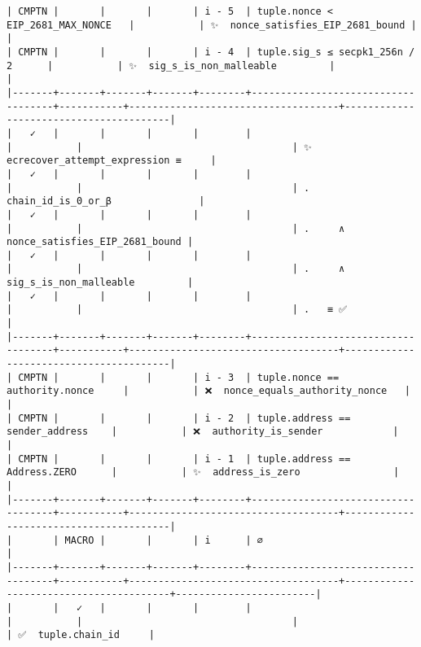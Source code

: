 \documentclass[varwidth=\maxdimen,margin=0.5cm,multi={verbatim}]{standalone}
\begin{document}
\begin{verbatim}
| CMPTN |       |       |       | i - 5  | tuple.nonce < EIP_2681_MAX_NONCE   |           | ✨  nonce_satisfies_EIP_2681_bound |                                        |
| CMPTN |       |       |       | i - 4  | tuple.sig_s ≤ secpk1_256n / 2      |           | ✨  sig_s_is_non_malleable         |                                        |
|-------+-------+-------+-------+--------+------------------------------------+-----------+------------------------------------+----------------------------------------|
|   ✓   |       |       |       |        |                                    |           |                                    | ✨  ecrecover_attempt_expression ≡     |
|   ✓   |       |       |       |        |                                    |           |                                    | .     chain_id_is_0_or_β               |
|   ✓   |       |       |       |        |                                    |           |                                    | .     ∧ nonce_satisfies_EIP_2681_bound |
|   ✓   |       |       |       |        |                                    |           |                                    | .     ∧ sig_s_is_non_malleable         |
|   ✓   |       |       |       |        |                                    |           |                                    | .   ≡ ✅                               |
|-------+-------+-------+-------+--------+------------------------------------+-----------+------------------------------------+----------------------------------------|
| CMPTN |       |       |       | i - 3  | tuple.nonce == authority.nonce     |           | ❌  nonce_equals_authority_nonce   |                                        |
| CMPTN |       |       |       | i - 2  | tuple.address == sender_address    |           | ❌  authority_is_sender            |                                        |
| CMPTN |       |       |       | i - 1  | tuple.address == Address.ZERO      |           | ✨  address_is_zero                |                                        |
|-------+-------+-------+-------+--------+------------------------------------+-----------+------------------------------------+----------------------------------------|
|       | MACRO |       |       | i      | ∅                                  |
|-------+-------+-------+-------+--------+------------------------------------+-----------+------------------------------------+----------------------------------------+------------------------|
|       |   ✓   |       |       |        |                                    |           |                                    |                                        | ✅  tuple.chain_id     |

\end{verbatim}
\end{document}
